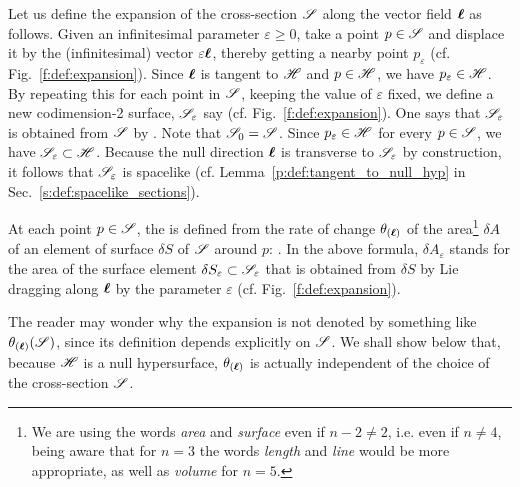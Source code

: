 Let us define the expansion of the cross-section $\mathscr{S}$ along the vector
field $\bm{\ell}$ as follows. Given an infinitesimal parameter $\varepsilon\geq 0$, take a point
$p\in \mathscr{S}$ and displace it by the (infinitesimal) vector $\varepsilon \bm{\ell}$, thereby getting
a nearby point $p_\varepsilon$ (cf. Fig.~\ref{f:def:expansion}).
Since $\bm{\ell}$ is tangent to $\mathscr{H}$ and $p\in\mathscr{H}$, we have $p_\varepsilon\in\mathscr{H}$.
By repeating this for each point in $\mathscr{S}$,
keeping the value of $\varepsilon$ fixed, we define a new codimension-2 surface,
$\mathscr{S}_\varepsilon$ say (cf. Fig.~\ref{f:def:expansion}). One says that $\mathscr{S}_\varepsilon$ is obtained
from $\mathscr{S}$ by .
Note that $\mathscr{S}_0 = \mathscr{S}$.
Since $p_\varepsilon\in\mathscr{H}$ for every $p\in\mathscr{S}$, we have $\mathscr{S}_\varepsilon\subset \mathscr{H}$.
Because the null direction $\bm{\ell}$ is transverse to $\mathscr{S}_\varepsilon$ by construction, it
follows that $\mathscr{S}_\varepsilon$ is spacelike (cf. Lemma~\ref{p:def:tangent_to_null_hyp}
in Sec.~\ref{s:def:spacelike_sections}).

At each point $p\in\mathscr{S}$, the  is defined from the
rate of change $\theta_{(\bm{\ell})}$ of the area\footnote{We are using the words
\emph{area} and \emph{surface} even if $n-2 \not= 2$, i.e. even if $n\not = 4$,
being aware that for $n=3$ the words \emph{length} and \emph{line} would
be more appropriate, as well as \emph{volume} for $n=5$.}
 $\delta A$ of an element of surface $\delta S$ of
$\mathscr{S}$ around $p$:
\be \label{e:def:def_expansion}
    .
\ee
In the above formula, $\delta A_\varepsilon$ stands for the area of the
surface element $\delta S_\varepsilon\subset \mathscr{S}_\varepsilon$ that is obtained from $\delta S$ by
Lie dragging along $\bm{\ell}$ by the parameter $\varepsilon$ (cf. Fig.~\ref{f:def:expansion}).
\begin{remark} \label{r:def:expansion_indpt_S}
The reader may wonder why the expansion is not denoted by something like
$\theta_{(\bm{\ell})}(\mathscr{S})$, since its definition depends explicitly on
$\mathscr{S}$. We shall show below that, because $\mathscr{H}$ is a null hypersurface, $\theta_{(\bm{\ell})}$
is actually independent of the choice of the cross-section $\mathscr{S}$.
\end{remark}

